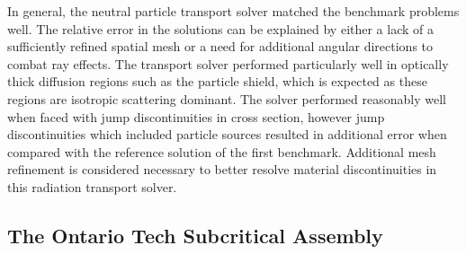 In general, the neutral particle transport solver matched the benchmark problems well. The relative error in the solutions can be explained by either a lack of a sufficiently refined spatial mesh or a need for additional angular directions to combat ray effects. The transport solver performed particularly well in optically thick diffusion regions such as the particle shield, which is expected as these regions are isotropic scattering dominant. The solver performed reasonably well when faced with jump discontinuities in cross section, however jump discontinuities which included particle sources resulted in additional error when compared with the reference solution of the first benchmark. Additional mesh refinement is considered necessary to better resolve material discontinuities in this radiation transport solver.

\subsection{The Ontario Tech Subcritical Assembly}
\label{verification:radiation_transport_sn:subcritical}

